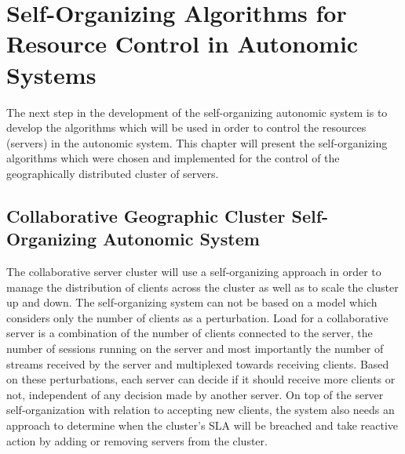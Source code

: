 \chapter{Self-Organizing Algorithms for Resource Control in Autonomic Systems} %
\label{Chapter4}

The next step in the development of the self-organizing autonomic system is to develop the algorithms which will be used in order to control the resources (servers) in the autonomic system. This chapter will present the self-organizing algorithms which were chosen and implemented for the control of the geographically distributed cluster of servers.

\section{Collaborative Geographic Cluster Self-Organizing Autonomic System}

The collaborative server cluster will use a self-organizing approach in order to manage the distribution of clients across the cluster as well as to scale the cluster up and down. The self-organizing system can not be based on a model which considers only the number of clients as a perturbation. Load for a collaborative server is a combination of the number of clients connected to the server, the number of sessions running on the server and most importantly the number of streams received by the server and multiplexed towards receiving clients. Based on these perturbations, each server can decide if it should receive more clients or not, independent of any decision made by another server. On top of the server self-organization with relation to accepting new clients, the system also needs an approach to determine when the cluster's SLA will be breached and take reactive action by adding or removing servers from the cluster. 

